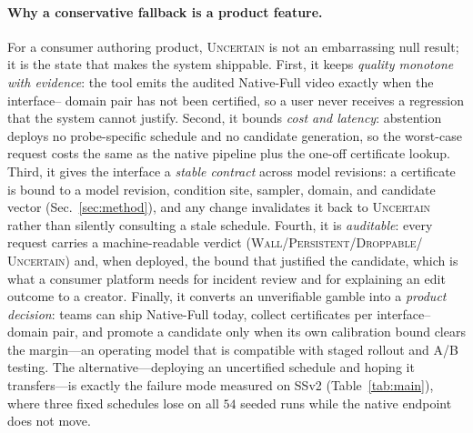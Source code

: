 \documentclass[letterpaper]{article}
\begin{document}
\paragraph{Why a conservative fallback is a product feature.}
For a consumer authoring product, \textsc{Uncertain} is not an
embarrassing null result; it is the state that makes the system
shippable. First, it keeps \emph{quality monotone with evidence}: the
tool emits the audited Native-Full video exactly when the interface--
domain pair has not been certified, so a user never receives a
regression that the system cannot justify. Second, it bounds
\emph{cost and latency}: abstention deploys no probe-specific schedule
and no candidate generation, so the worst-case request costs the same
as the native pipeline plus the one-off certificate lookup. Third, it
gives the interface a \emph{stable contract} across model revisions:
a certificate is bound to a model revision, condition site, sampler,
domain, and candidate vector (Sec.~\ref{sec:method}), and any change
invalidates it back to \textsc{Uncertain} rather than silently
consulting a stale schedule. Fourth, it is \emph{auditable}: every
request carries a machine-readable verdict
(\textsc{Wall}/\textsc{Persistent}/\textsc{Droppable}/
\textsc{Uncertain}) and, when deployed, the bound that justified the
candidate, which is what a consumer platform needs for incident review
and for explaining an edit outcome to a creator. Finally, it converts
an unverifiable gamble into a \emph{product decision}: teams can ship
Native-Full today, collect certificates per interface--domain pair,
and promote a candidate only when its own calibration bound clears the
margin---an operating model that is compatible with staged rollout and
A/B testing. The alternative---deploying an uncertified schedule and
hoping it transfers---is exactly the failure mode measured on SSv2
(Table~\ref{tab:main}), where three fixed schedules lose on all $54$
seeded runs while the native endpoint does not move.
\end{document}
